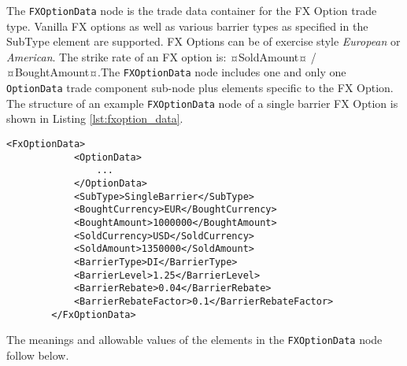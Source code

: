 The \lstinline!FXOptionData!  node is the trade data container for the FX Option trade type.  Vanilla FX options as well as various barrier types as specified in the SubType element are supported. FX Options can be of exercise style \emph{European} or \emph{American}. The strike rate of an FX option is: ¤SoldAmount¤ / ¤BoughtAmount¤.The \lstinline!FXOptionData!  node includes one and only one  \lstinline!OptionData! trade component sub-node plus elements specific to the FX Option. The structure of an example \lstinline!FXOptionData!  node of a single barrier FX Option is shown in Listing \ref{lst:fxoption_data}.  


\begin{lstlisting}[caption=FXOptionData, label=lst:fxoption_data]
        <FxOptionData>
            <OptionData>
            	...
            </OptionData>
            <SubType>SingleBarrier</SubType>
            <BoughtCurrency>EUR</BoughtCurrency>
            <BoughtAmount>1000000</BoughtAmount>
            <SoldCurrency>USD</SoldCurrency>
            <SoldAmount>1350000</SoldAmount>
            <BarrierType>DI</BarrierType>
            <BarrierLevel>1.25</BarrierLevel>
            <BarrierRebate>0.04</BarrierRebate>
            <BarrierRebateFactor>0.1</BarrierRebateFactor>
        </FxOptionData>
\end{lstlisting}

The meanings and allowable values of the elements in the \lstinline!FXOptionData!  node follow below.

